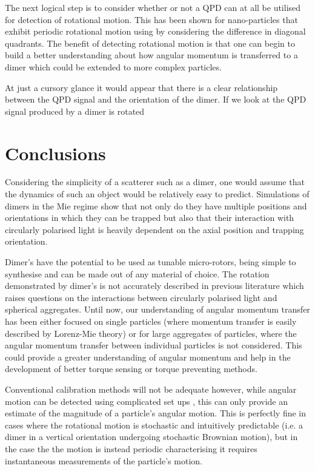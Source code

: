 The next logical step is to consider whether or not a QPD can at 
all be utilised for detection of rotational motion. This has been
shown for nano-particles that exhibit periodic rotational motion
using by considering the difference in diagonal quadrants. The 
benefit of detecting rotational motion is that one can begin to 
build a better understanding about how angular momentum is 
transferred to a dimer which could be extended to more complex
particles. 

At just a cursory glance it would appear that there is a clear
relationship between the QPD signal and the orientation of the 
dimer. If we look at the QPD signal produced by a dimer is 
rotated 

\section{Conclusions}
Considering the simplicity of a scatterer such as a dimer, one would 
assume that the dynamics of such an object would be relatively easy 
to predict. Simulations of dimers in the Mie regime show that not 
only do they have multiple positions and orientations in which they 
can be trapped but also that their interaction with circularly 
polarised light is heavily dependent on the axial position and 
trapping orientation. 

Dimer's have the potential to be used as tunable micro-rotors, being 
simple to synthesise and can be made out of any material of choice.
The rotation demonstrated by dimer's is not accurately described in
previous literature which raises questions on the interactions between
circularly polarised light and spherical aggregates. Until now, our 
understanding of angular momentum transfer has been either focused on 
single particles (where momentum transfer is easily described by 
Lorenz-Mie theory) or for large aggregates of particles, where the 
angular momentum transfer between individual particles is not considered. 
This could provide a greater understanding of angular momentum and help in 
the development of better torque sensing or torque preventing methods.

Conventional calibration methods will not be adequate however, while
angular motion can be detected using complicated set ups \cite{Bang2020},
this can only provide an estimate of the magnitude of a particle's 
angular motion. This is perfectly fine in cases where the rotational
motion is stochastic and intuitively predictable (i.e. a dimer in a
vertical orientation undergoing stochastic Brownian motion), but in 
the case the the motion is instead periodic characterising it requires
instantaneous measurements of the particle's motion. 
